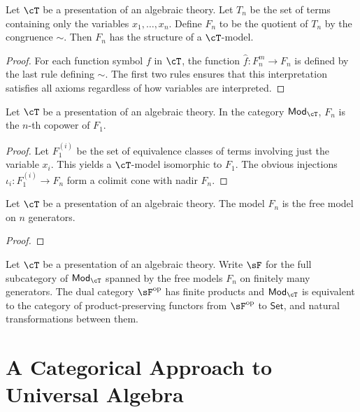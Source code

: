 \documentclass{amsart}
\begin{document}
\begin{lem}
  Let $\cT$ be a presentation of an algebraic theory.
  Let $T_{n}$ be the set of terms containing only the variables $x_{1},\ldots,x_{n}$.
  Define $F_{n}$ to be the quotient of $T_{n}$ by the congruence $\sim$.
  Then $F_{n}$ has the structure of a $\cT$-model.
\end{lem}
\begin{proof}
  For each function symbol $f$ in $\cT$, the function $\hat{f} : F_{n}^{m} \to F_{n}$ is defined by
  the last rule defining $\sim$.
  The first two rules ensures that this interpretation satisfies all axioms regardless of how variables are interpreted.
\end{proof}

\begin{lem}
  Let $\cT$ be a presentation of an algebraic theory.
  In the category $\mathsf{Mod}_{\cT}$, $F_{n}$ is the $n$-th copower of $F_{1}$.
\end{lem}
\begin{proof}
  Let $F_{1}^{(i)}$ be the set of equivalence classes of terms involving just the variable $x_{i}$.
  This yields a $\cT$-model isomorphic to $F_{1}$.
  The obvious injections $\iota_{i} : F_{1}^{(i)} \to F_{n}$ form a colimit cone with nadir $F_{n}$.
\end{proof}

\begin{lem}
  Let $\cT$ be a presentation of an algebraic theory.
  The model $F_{n}$ is the free model on $n$ generators.
\end{lem}
\begin{proof}
  
\end{proof}

\begin{lem}
  Let $\cT$ be a presentation of an algebraic theory.
  Write $\sF$ for the full subcategory of $\mathsf{Mod}_{\cT}$ spanned by the free models $F_{n}$ on finitely many generators.
  The dual category $\sF\op$ has finite products and $\mathsf{Mod}_{\cT}$ is equivalent to the category of product-preserving functors from $\sF\op$ to $\mathsf{Set}$, and natural transformations between them.
\end{lem}

\section{A Categorical Approach to Universal Algebra}
\label{sec:a-categorical-approach-to-universal-algebra}
\end{document}
